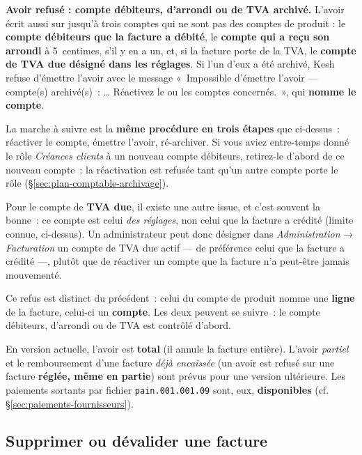 \documentclass[a4paper,11pt,oneside]{article}
\begin{document}
\begin{keshwarning}
\textbf{Avoir refusé : compte débiteurs, d'arrondi ou de TVA archivé.} L'avoir écrit aussi sur jusqu'à trois comptes qui ne sont pas des comptes de produit : le \textbf{compte débiteurs que la facture a débité}, le \textbf{compte qui a reçu son arrondi} à 5~centimes, s'il y en a un, et, si la facture porte de la TVA, le \textbf{compte de TVA due désigné dans les réglages}. Si l'un d'eux a été archivé, Kesh refuse d'émettre l'avoir avec le message «~Impossible d'émettre l'avoir --- compte(s) archivé(s)~: \ldots{} Réactivez le ou les comptes concernés.~», qui \textbf{nomme le compte}.

La marche à suivre est la \textbf{même procédure en trois étapes} que ci-dessus~: réactiver le compte, émettre l'avoir, ré-archiver. Si vous aviez entre-temps donné le rôle \emph{Créances clients} à un nouveau compte débiteurs, retirez-le d'abord de ce nouveau compte~: la réactivation est refusée tant qu'un autre compte porte le rôle (\S\ref{sec:plan-comptable-archivage}).

Pour le compte de \textbf{TVA due}, il existe une autre issue, et c'est souvent la bonne~: ce compte est celui \emph{des réglages}, non celui que la facture a crédité (limite connue, ci-dessus). Un administrateur peut donc désigner dans \emph{Administration} → \emph{Facturation} un compte de TVA due actif --- de préférence celui que la facture a crédité ---, plutôt que de réactiver un compte que la facture n'a peut-être jamais mouvementé.

Ce refus est distinct du précédent~: celui du compte de produit nomme une \textbf{ligne} de la facture, celui-ci un \textbf{compte}. Les deux peuvent se suivre~: le compte débiteurs, d'arrondi ou de TVA est contrôlé d'abord.
\end{keshwarning}

\begin{keshnote}
En version actuelle, l'avoir est \textbf{total} (il annule la facture entière). L'avoir \emph{partiel} et le remboursement d'une facture \emph{déjà encaissée} (un avoir est refusé sur une facture \textbf{réglée, même en partie}) sont prévus pour une version ultérieure. Les paiements sortants par fichier \texttt{pain.001.001.09} sont, eux, \textbf{disponibles} (cf. \S\ref{sec:paiements-fournisseurs}).
\end{keshnote}

\subsection{Supprimer ou dévalider une facture}
\label{sec:suppression-facture}
\end{document}
